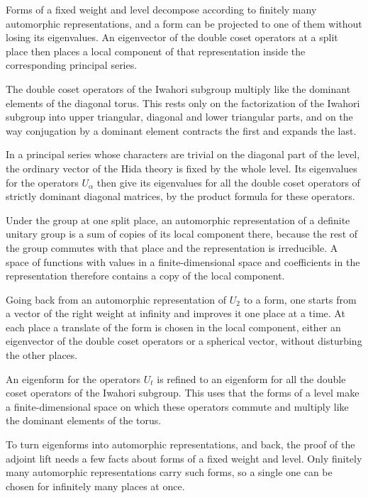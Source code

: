 Forms of a fixed weight and level decompose according to finitely many automorphic representations, and a form can be projected to one of them without losing its eigenvalues. An eigenvector of the double coset operators at a split place then places a local component of that representation inside the corresponding principal series.

The double coset operators of the Iwahori subgroup multiply like the dominant elements of the diagonal torus. This rests only on the factorization of the Iwahori subgroup into upper triangular, diagonal and lower triangular parts, and on the way conjugation by a dominant element contracts the first and expands the last.

In a principal series whose characters are trivial on the diagonal part of the level, the ordinary vector of the Hida theory is fixed by the whole level. Its eigenvalues for the operators $U_\alpha$ then give its eigenvalues for all the double coset operators of strictly dominant diagonal matrices, by the product formula for these operators.

Under the group at one split place, an automorphic representation of a definite unitary group is a sum of copies of its local component there, because the rest of the group commutes with that place and the representation is irreducible. A space of functions with values in a finite-dimensional space and coefficients in the representation therefore contains a copy of the local component.

Going back from an automorphic representation of $U_2$ to a form, one starts from a vector of the right weight at infinity and improves it one place at a time. At each place a translate of the form is chosen in the local component, either an eigenvector of the double coset operators or a spherical vector, without disturbing the other places.

An eigenform for the operators $U_t$ is refined to an eigenform for all the double coset operators of the Iwahori subgroup. This uses that the forms of a level make a finite-dimensional space on which these operators commute and multiply like the dominant elements of the torus.

To turn eigenforms into automorphic representations, and back, the proof of the adjoint lift needs a few facts about forms of a fixed weight and level. Only finitely many automorphic representations carry such forms, so a single one can be chosen for infinitely many places at once.

